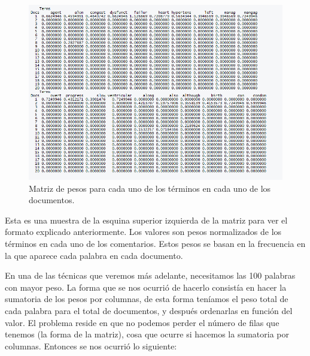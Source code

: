 \documentclass[spanish,]{article}
\begin{document}
\begin{figure}[h]
    \centering
    \includegraphics[width=1\textwidth]{figuras/clustering/tfidf.png}
    \caption{Matriz de pesos para cada uno de los términos en cada uno de los documentos.}
    \label{fig:clustering:tfidf}
\end{figure}

Esta es una muestra de la esquina superior izquierda de la matriz para
ver el formato explicado anteriormente. Los valores son pesos
normalizados de los términos en cada uno de los comentarios. Estos pesos
se basan en la frecuencia en la que aparece cada palabra en cada
documento.

En una de las técnicas que veremos más adelante, necesitamos las 100
palabras con mayor peso. La forma que se nos ocurrió de hacerlo
consistía en hacer la sumatoria de los pesos por columnas, de esta forma
teníamos el peso total de cada palabra para el total de documentos, y
después ordenarlas en función del valor. El problema reside en que no
podemos perder el número de filas que tenemos (la forma de la matriz),
cosa que ocurre si hacemos la sumatoria por columnas. Entonces se nos
ocurrió lo siguiente:
\end{document}
